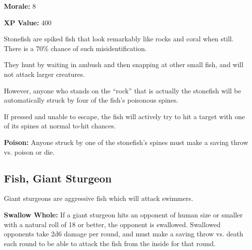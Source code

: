 \begin{multicols*}{2}
{\textbf{Morale:} 8

\textbf{XP Value:} 400}

Stonefish are spiked fish that look remarkably like rocks and coral when still. There is a 70\% chance of such misidentification.

They hunt by waiting in ambush and then snapping at other small fish, and will not attack larger creatures.

However, anyone who stands on the “rock” that is actually the stonefish will be automatically struck by four of the fish’s poisonous spines.

If pressed and unable to escape, the fish will actively try to hit a target with one of its spines at normal to-hit chances.

\textbf{Poison:} Anyone struck by one of the stonefish's spines must make a saving throw vs. poison or die.

\subsection{Fish, Giant Sturgeon}

Giant sturgeons are aggressive fish which will attack swimmers.

\textbf{Swallow Whole:} If a giant sturgeon hits an opponent of human size or smaller with a natural roll of 18 or better, the opponent is swallowed. Swallowed opponents take 2d6 damage per round, and must make a saving throw vs. death each round to be able to attack the fish from the inside for that round.


\end{multicols*}
